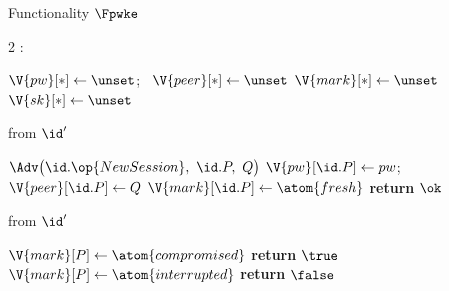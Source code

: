 \begin{interface}[nofloat]{Functionality $\Fpwke$ \\
\params{$\PID$, \quad $\Ps$, \quad $\admits$, \quad
$\uses := \{(\Adv,\serves)\}$, \quad $\pars := \ell$}}

{\scriptsize
\setlength{\columnsep}{1.4em}
\begin{multicols}{2}
:
\begin{algorithmic}[1]
\setcounter{contline}{0}\algcont
\State $\V{pw}[*] \gets \unset$; \ $\V{peer}[*] \gets \unset$
\State $\V{mark}[*] \gets \unset$
\State $\V{sk}[*] \gets \unset$
\algsave
\end{algorithmic}
\vspace{1.4ex}

 \quad from $\id'$
\begin{algorithmic}[1]
\algcont
{} \label{ln:pwonce}
\State $\Adv\bigl(\id.\op{NewSession},\ \id.P,\ Q\bigr)$ \label{ln:pwleak}
\State $\V{pw}[\id.P] \gets pw$; \ $\V{peer}[\id.P] \gets Q$
\State $\V{mark}[\id.P] \gets \atom{fresh}$
\State \textbf{return} $\ok$
\algsave
\end{algorithmic}
\vspace{1.4ex}

 \quad from $\id'$
\begin{algorithmic}[1]
\algcont
{} \label{ln:pwoneguess}
  \State $\V{mark}[P] \gets \atom{compromised}$ \label{ln:pwright}
  \State \textbf{return} $\true$
\EndIf
\State $\V{mark}[P] \gets \atom{interrupted}$ \label{ln:pwwrong}
\State \textbf{return} $\false$
\algsave
\end{algorithmic}
\vspace{1.4ex}

\columnbreak


\end{multicols}}
\end{interface}
